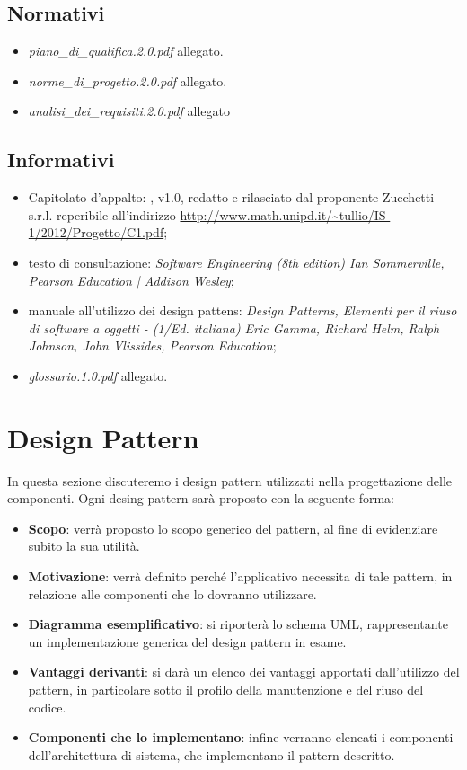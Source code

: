 \subsection{Normativi}
\begin{itemize}
\item[] \textit{piano\_di\_qualifica.2.0.pdf} allegato.
\item[] \textit{norme\_di\_progetto.2.0.pdf} allegato.
\item[] \textit{analisi\_dei\_requisiti.2.0.pdf} allegato
\end{itemize}

\subsection{Informativi}
\begin{itemize}
\item[] Capitolato d'appalto: \caName{}, v1.0, redatto e rilasciato dal proponente Zucchetti s.r.l. reperibile all'indirizzo \url{http://www.math.unipd.it/~tullio/IS-1/2012/Progetto/C1.pdf};
\item[] testo di consultazione: \textit{Software Engineering (8th edition) Ian Sommerville, Pearson Education | Addison Wesley};
\item[] manuale all'utilizzo dei design pattens: \textit{Design Patterns, Elementi per il riuso di software a oggetti - (1/Ed. italiana) Eric Gamma, Richard Helm, Ralph Johnson, John Vlissides, Pearson Education};
\item[] \textit{glossario.1.0.pdf} allegato.
\end{itemize}

\clearpage
\section{Design Pattern}
In questa sezione discuteremo i design pattern utilizzati nella progettazione delle componenti. Ogni desing pattern sarà proposto con la seguente forma:

\begin{itemize}
	\item \textbf{Scopo}: verrà proposto lo scopo generico del pattern, al fine di evidenziare subito la sua utilità.
	\item \textbf{Motivazione}: verrà definito perché l'applicativo necessita di tale pattern, in relazione alle componenti che lo dovranno utilizzare.
	\item \textbf{Diagramma esemplificativo}: si riporterà lo schema UML, rappresentante un implementazione generica del design pattern in esame.
	\item \textbf{Vantaggi derivanti}: si darà un elenco dei vantaggi apportati dall'utilizzo del pattern, in particolare sotto il profilo della manutenzione e del riuso del codice.
	\item \textbf{Componenti che lo implementano}: infine verranno elencati i componenti dell'architettura di sistema, che implementano il pattern descritto.
\end{itemize}

